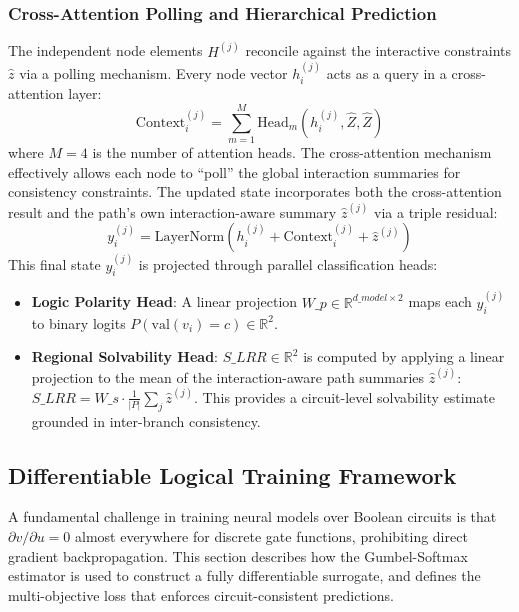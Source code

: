 \documentclass[conference]{IEEEtran}
\begin{document}
\subsubsection{Cross-Attention Polling and Hierarchical Prediction}
The independent node elements $H^{(j)}$ reconcile against the interactive constraints $\hat{z}$ via a polling mechanism. Every node vector $h_i^{(j)}$ acts as a query in a cross-attention layer:
\begin{equation}
   \text{Context}_i^{(j)} = \sum_{m=1}^M \text{Head}_m(h_i^{(j)}, \hat{Z}, \hat{Z})
\end{equation}
where $M=4$ is the number of attention heads. The cross-attention mechanism effectively allows each node to ``poll'' the global interaction summaries for consistency constraints. The updated state incorporates both the cross-attention result and the path's own interaction-aware summary $\hat{z}^{(j)}$ via a triple residual:
\begin{equation}
   y_i^{(j)} = \text{LayerNorm}\!\left(h_i^{(j)} + \text{Context}_i^{(j)} + \hat{z}^{(j)}\right)
\end{equation}
This final state $y_i^{(j)}$ is projected through parallel classification heads:
\begin{itemize}
   \item \textbf{Logic Polarity Head}: A linear projection $W\_p \in \mathbb{R}^{d\_{model} \times 2}$ maps each $y_i^{(j)}$ to binary logits $P(\text{val}(v_i) = c) \in \mathbb{R}^2$.
   \item \textbf{Regional Solvability Head}: $S\_{LRR} \in \mathbb{R}^2$ is computed by applying a linear projection to the mean of the interaction-aware path summaries $\hat{z}^{(j)}$: $S\_{LRR} = W\_s \cdot \frac{1}{|P|} \sum_j \hat{z}^{(j)}$. This provides a circuit-level solvability estimate grounded in inter-branch consistency.
\end{itemize}

\subsection{Differentiable Logical Training Framework}
A fundamental challenge in training neural models over Boolean circuits is that $\partial v / \partial u = 0$ almost everywhere for discrete gate functions, prohibiting direct gradient backpropagation. This section describes how the Gumbel-Softmax estimator is used to construct a fully differentiable surrogate, and defines the multi-objective loss that enforces circuit-consistent predictions.
\end{document}
